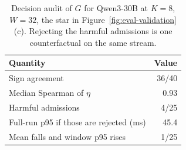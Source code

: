 \begin{table}[tbh]
  \centering
  \caption{Decision audit of \(G\) for Qwen3-30B at \(K=8\), \(W=32\), the star in Figure~\ref{fig:eval-validation}(c). Rejecting the harmful admissions is one counterfactual on the same stream.}
  \label{tab:eval-decision}
  \small
  \setlength{\tabcolsep}{4pt}
  \begin{tabular}{@{}lr@{}}
    \toprule
    Quantity & Value \\
    \midrule
    Sign agreement & 36/40 \\
    Median Spearman of \(\eta\) & 0.93 \\
    Harmful admissions & 4/25 \\
    Full-run p95 if those are rejected (ms) & 45.4 \\
    Mean falls and window p95 rises & 1/25 \\
    \bottomrule
  \end{tabular}
\end{table}
